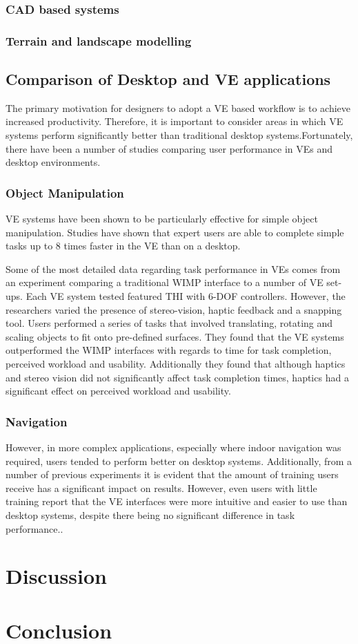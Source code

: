 \documentclass{sig-alternate-05-2015}
\begin{document}
\subsubsection{CAD based systems}
\subsubsection{Terrain and landscape modelling}
\subsection{Comparison of Desktop and VE applications}
The primary motivation for designers to adopt a VE based workflow is to achieve increased productivity. Therefore, it is important to consider areas in which VE systems perform significantly better than traditional desktop systems.Fortunately, there have been a number of studies comparing user performance in VEs and desktop environments.
\subsubsection{Object Manipulation}
VE systems have been shown to be particularly effective for simple object manipulation. Studies have shown that expert users are able to complete simple tasks up to 8 times faster in the VE than on a desktop\cite{Schultheis2012}.

Some of the most detailed data regarding task performance in VEs comes from an experiment comparing a traditional WIMP interface to a number of VE set-ups. Each VE system tested featured THI with 6-DOF controllers. However, the researchers varied the presence of stereo-vision, haptic feedback and a snapping tool\cite{Scali2003}. Users performed a series of tasks that involved translating, rotating and scaling objects to fit onto pre-defined surfaces. They found that the VE systems outperformed the WIMP interfaces with regards to time for task completion, perceived workload and usability. Additionally they found that although haptics and stereo vision did not significantly affect task completion times, haptics had a significant effect on perceived workload and usability.
\subsubsection{Navigation}
However, in more complex applications, especially where indoor navigation was required, users tended to perform better on desktop systems\cite{SousaSantos2009}. Additionally, from a number of previous experiments it is evident that the amount of training users receive has a significant impact on results. However, even users with little training report that the VE interfaces were more intuitive and easier to use than desktop systems, despite there being no significant difference in task performance.\cite{Toma2012}.
\section{Discussion}
\section{Conclusion}


\end{document}
